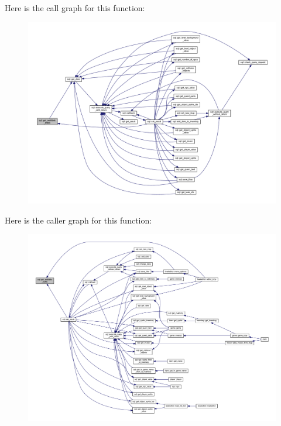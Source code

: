 Here is the call graph for this function\+:
\nopagebreak
\begin{figure}[H]
\begin{center}
\leavevmode
\includegraphics[width=350pt]{classsql_a29fe43df701460704744049aec28d58e_cgraph}
\end{center}
\end{figure}
Here is the caller graph for this function\+:
\nopagebreak
\begin{figure}[H]
\begin{center}
\leavevmode
\includegraphics[width=350pt]{classsql_a29fe43df701460704744049aec28d58e_icgraph}
\end{center}
\end{figure}
\mbox{\label{classsql_af126860a2afcf82e53c9f895577bab76}} 
